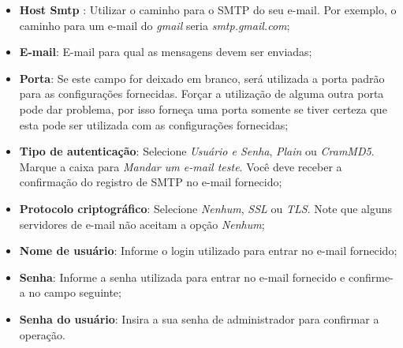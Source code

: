 \begin{itemize}
	\item \textbf{Host Smtp} : Utilizar o caminho para o SMTP do seu e-mail. Por exemplo, o caminho para um e-mail do \textit{gmail} seria \textit{smtp.gmail.com};
	\item \textbf{E-mail}: E-mail para qual as mensagens devem ser enviadas;
	\item \textbf{Porta}: Se este campo for deixado em branco, será utilizada a porta padrão para as configurações fornecidas. Forçar a utilização de alguma outra porta pode dar problema, por isso forneça uma porta somente se tiver certeza que esta pode ser utilizada com as configurações fornecidas;
    \item \textbf{Tipo de autenticação}: Selecione \textit{Usuário e Senha}, \textit{Plain} ou \textit{CramMD5}. Marque a caixa para \textit{Mandar um e-mail teste}. Você deve receber a confirmação do registro de SMTP no e-mail fornecido;
    \item \textbf{Protocolo criptográfico}: Selecione \textit{Nenhum}, \textit{SSL} ou \textit{TLS}. Note que alguns servidores de e-mail não aceitam a opção \textit{Nenhum};
    \item \textbf{Nome de usuário}: Informe o login utilizado para entrar no e-mail fornecido;
    \item \textbf{Senha}: Informe a senha utilizada para entrar no e-mail fornecido e confirme-a no campo seguinte;
    \item \textbf{Senha do usuário}: Insira a sua senha de administrador para confirmar a operação.
\end{itemize}

